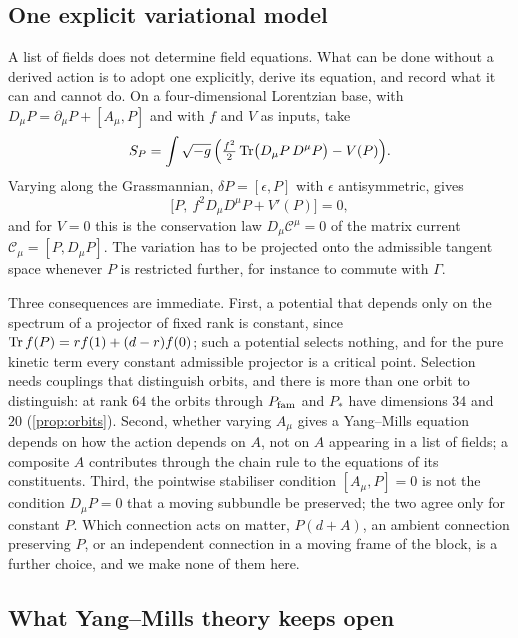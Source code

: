 \subsection{One explicit variational model}
\label{sec:trialaction}

A list of fields does not determine field equations. What can be done without a derived action is to adopt one explicitly, derive
its equation, and record what it can and cannot do. On a four-dimensional Lorentzian base, with $D_\mu P=\partial_\mu P+[A_\mu,P]$ and
with $f$ and $V$ as inputs, take
\begin{equation}
\label{eq:trialS}
S_P=\int\sqrt{-g}\,\Bigl(\tfrac{f^2}2\operatorname{Tr}\bigl(D_\mu P\,D^\mu P\bigr)-V(P)\Bigr).
\end{equation}
Varying along the Grassmannian, $\delta P=[\epsilon,P]$ with $\epsilon$ antisymmetric, gives
\begin{equation}
\label{eq:Pieom}
\bigl[P,\ f^2D_\mu D^\mu P+V'(P)\bigr]=0 ,
\end{equation}
and for $V=0$ this is the conservation law $D_\mu\mathcal C^\mu=0$ of the matrix current $\mathcal C_\mu=[P,D_\mu P]$. The variation
has to be projected onto the admissible tangent space whenever $P$ is restricted further, for instance to commute with $\Gamma$.

Three consequences are immediate. First, a potential that depends only on the spectrum of a projector of fixed rank is constant,
since $\operatorname{Tr} f(P)=rf(1)+(d-r)f(0)$; such a potential selects nothing, and for the pure kinetic term every constant admissible projector
is a critical point. Selection needs couplings that distinguish orbits, and there is more than one orbit to distinguish: at rank
$64$ the orbits through $P_{\rm fam}$ and $P_*$ have dimensions $34$ and $20$ (\cref{prop:orbits}). Second, whether varying $A_\mu$ gives a
Yang--Mills equation depends on how the action depends on $A$, not on $A$ appearing in a list of fields; a composite $A$ contributes
through the chain rule to the equations of its constituents. Third, the pointwise stabiliser condition $[A_\mu,P]=0$ is not the
condition $D_\mu P=0$ that a moving subbundle be preserved; the two agree only for constant $P$. Which connection acts on matter,
$P(d+A)$, an ambient connection preserving $P$, or an independent connection in a moving frame of the block, is a further choice,
and we make none of them here.

\subsection{What Yang--Mills theory keeps open}
\label{sec:ym}

